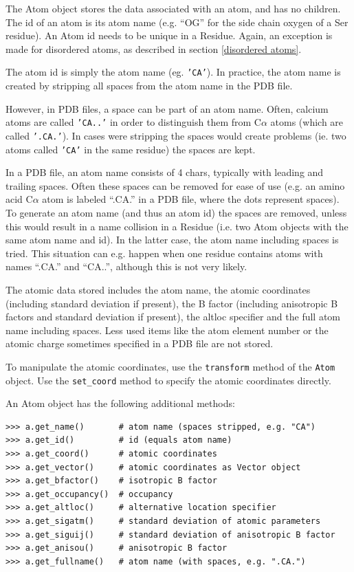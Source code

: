 \documentclass{report}
\begin{document}
The Atom object stores the data associated with an atom, and has no children.
The id of an atom is its atom name (e.g. ``OG'' for the side chain oxygen
of a Ser residue). An Atom id needs to be unique in a Residue. Again, an exception is made for disordered atoms, as described in section \ref{disordered atoms}.

The atom id is simply the atom name (eg. \texttt{'CA'}). In practice,
the atom name is created by stripping all spaces from the atom name
in the PDB file. 

However, in PDB files, a space can be part of an atom name. Often,
calcium atoms are called \texttt{'CA..'} in order to distinguish them
from C$\alpha$ atoms (which are called \texttt{'.CA.'}). In cases
were stripping the spaces would create problems (ie. two atoms called
\texttt{'CA'} in the same residue) the spaces are kept.

In a PDB file, an atom name consists of 4 chars, typically with leading and
trailing spaces. Often these spaces can be removed for ease of use (e.g. an
amino acid C\( \alpha  \) atom is labeled ``.CA.'' in a PDB file, where
the dots represent spaces). To generate an atom name (and thus an atom id) the
spaces are removed, unless this would result in a name collision in a Residue
(i.e. two Atom objects with the same atom name and id). In the latter case,
the atom name including spaces is tried. This situation can e.g. happen when
one residue contains atoms with names ``.CA.'' and ``CA..'', although
this is not very likely.

The atomic data stored includes the atom name, the atomic coordinates (including
standard deviation if present), the B factor (including anisotropic B factors
and standard deviation if present), the altloc specifier and the full atom name
including spaces. Less used items like the atom element number or the atomic
charge sometimes specified in a PDB file are not stored.

To manipulate the atomic coordinates, use the \texttt{transform} method of
the \texttt{Atom} object. Use the \texttt{set\_coord} method to specify the
atomic coordinates directly.

An Atom object has the following additional methods:

\begin{verbatim}
>>> a.get_name()       # atom name (spaces stripped, e.g. "CA")
>>> a.get_id()         # id (equals atom name)
>>> a.get_coord()      # atomic coordinates
>>> a.get_vector()     # atomic coordinates as Vector object
>>> a.get_bfactor()    # isotropic B factor
>>> a.get_occupancy()  # occupancy
>>> a.get_altloc()     # alternative location specifier
>>> a.get_sigatm()     # standard deviation of atomic parameters
>>> a.get_siguij()     # standard deviation of anisotropic B factor
>>> a.get_anisou()     # anisotropic B factor
>>> a.get_fullname()   # atom name (with spaces, e.g. ".CA.")
\end{verbatim}
\end{document}
